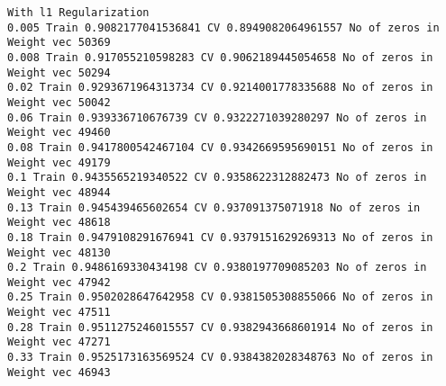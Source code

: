 \documentclass[11pt]{article}
\begin{document}
    \begin{Verbatim}[commandchars=\\\{\}]
With l1 Regularization
0.005 Train 0.9082177041536841 CV 0.8949082064961557 No of zeros in Weight vec 50369
0.008 Train 0.917055210598283 CV 0.9062189445054658 No of zeros in Weight vec 50294
0.02 Train 0.9293671964313734 CV 0.9214001778335688 No of zeros in Weight vec 50042
0.06 Train 0.939336710676739 CV 0.9322271039280297 No of zeros in Weight vec 49460
0.08 Train 0.9417800542467104 CV 0.9342669595690151 No of zeros in Weight vec 49179
0.1 Train 0.9435565219340522 CV 0.9358622312882473 No of zeros in Weight vec 48944
0.13 Train 0.945439465602654 CV 0.937091375071918 No of zeros in Weight vec 48618
0.18 Train 0.9479108291676941 CV 0.9379151629269313 No of zeros in Weight vec 48130
0.2 Train 0.9486169330434198 CV 0.9380197709085203 No of zeros in Weight vec 47942
0.25 Train 0.9502028647642958 CV 0.9381505308855066 No of zeros in Weight vec 47511
0.28 Train 0.9511275246015557 CV 0.9382943668601914 No of zeros in Weight vec 47271
0.33 Train 0.9525173163569524 CV 0.9384382028348763 No of zeros in Weight vec 46943

    \end{Verbatim}
\end{document}
